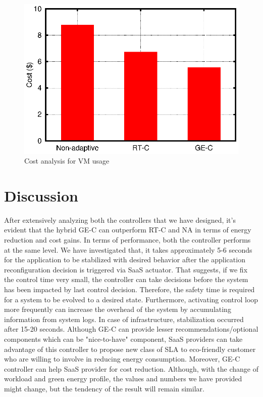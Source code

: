 \begin{figure} [htb]
\centering
\includegraphics[scale=.7]{Graphs/cost.eps}
\caption{Cost analysis for VM usage}
\label{fig:cost}
\end{figure}

\section{Discussion}

After extensively analyzing both the controllers that we have
designed, it’s evident that the hybrid GE-C can outperform
RT-C and NA in terms of energy reduction
and cost gains. In terms of performance, both the controller performs at the same level. We have investigated that, it takes approximately
5-6 seconds for the application to be stabilized
with desired behavior after the application reconfiguration decision is
triggered via SaaS actuator. That suggests, if we fix the control time very
small, the controller can take decisions before the system has
been impacted by last control decision. Therefore, the safety
time is required for a system to be evolved to a desired
state. Furthermore, activating control loop more frequently
can increase the overhead of the system by accumulating
information from system logs. In case of infrastructure, stabilization occurred after 15-20 seconds. 
Although GE-C can provide lesser recommendations/optional components which can be "nice-to-have" component,
SaaS providers can take advantage of
this controller to propose new class of SLA to eco-friendly
customer who are willing to involve in reducing energy consumption. Moreover, GE-C controller can help SaaS provider for cost reduction. Although, with the change of workload and green energy profile, the values and numbers we have provided might change, but the tendency of the result will remain similar.

